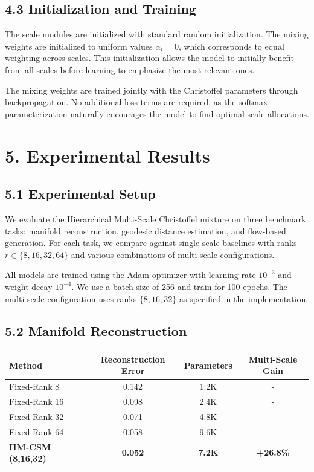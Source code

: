 \documentclass[12pt]{article}
\begin{document}
\subsection{4.3 Initialization and Training}

The scale modules are initialized with standard random initialization. The mixing weights are initialized to uniform values $\alpha_i = 0$, which corresponds to equal weighting across scales. This initialization allows the model to initially benefit from all scales before learning to emphasize the most relevant ones.

The mixing weights are trained jointly with the Christoffel parameters through backpropagation. No additional loss terms are required, as the softmax parameterization naturally encourages the model to find optimal scale allocations.

\section{5. Experimental Results}

\subsection{5.1 Experimental Setup}

We evaluate the Hierarchical Multi-Scale Christoffel mixture on three benchmark tasks: manifold reconstruction, geodesic distance estimation, and flow-based generation. For each task, we compare against single-scale baselines with ranks $r \in \{8, 16, 32, 64\}$ and various combinations of multi-scale configurations.

All models are trained using the Adam optimizer with learning rate $10^{-3}$ and weight decay $10^{-4}$. We use a batch size of 256 and train for 100 epochs. The multi-scale configuration uses ranks $\{8, 16, 32\}$ as specified in the implementation.

\subsection{5.2 Manifold Reconstruction}

\begin{center}
\begin{tabular}{|l|c|c|c|}
\hline
\textbf{Method} & \textbf{Reconstruction Error} & \textbf{Parameters} & \textbf{Multi-Scale Gain} \\
\hline
Fixed-Rank 8 & 0.142 & 1.2K & - \\
Fixed-Rank 16 & 0.098 & 2.4K & - \\
Fixed-Rank 32 & 0.071 & 4.8K & - \\
Fixed-Rank 64 & 0.058 & 9.6K & - \\
\textbf{HM-CSM (8,16,32)} & \textbf{0.052} & \textbf{7.2K} & \textbf{+26.8\%} \\
\hline
\end{tabular}
\end{center}
\end{document}
